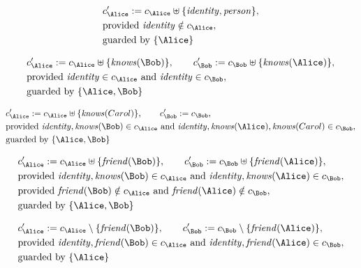 \begin{align*}
&
c'_
{
\Alice
}
 := 
c_
{
\Alice
}
 \uplus 
\{
\mathit{
identity
}
,
\mathit{
person
}
\}
,\\
&
\text{provided } 
\mathit{
identity
}
 \notin c_
{
\Alice
}
,\\
&
\text{guarded by } \{
\Alice
\}
\end{align*}

\begin{align*}
&
c'_
{
\Alice
}
 := 
c_
{
\Alice
}
 \uplus 
\{
\mathit{
knows
}
(
\Bob
)
\}
, \qquad 
c'_
{
\Bob
}
 := 
c_
{
\Bob
}
 \uplus 
\{
\mathit{
knows
}
(
\Alice
)
\}
,\\
&
\text{provided } 
\mathit{
identity
}
 \in c_
{
\Alice
}
 \text{ and } 
\mathit{
identity
}
 \in c_
{
\Bob
}
,\\
&
\text{guarded by } \{
\Alice
,
\Bob
\}
\end{align*}

\begin{align*}
&
c'_
{
\Alice
}
 := 
c_
{
\Alice
}
 \uplus 
\{
\mathit{
knows
}
(
Carol
)
\}
, \qquad 
c'_
{
\Bob
}
 := 
c_
{
\Bob
}
,\\
&
\text{provided } 
\mathit{
identity
}
,
\mathit{
knows
}
(
\Bob
)
 \in c_
{
\Alice
}
 \text{ and } 
\mathit{
identity
}
,
\mathit{
knows
}
(
\Alice
)
,
\mathit{
knows
}
(
Carol
)
 \in c_
{
\Bob
}
,\\
&
\text{guarded by } \{
\Alice
,
\Bob
\}
\end{align*}

\begin{align*}
&
c'_
{
\Alice
}
 := 
c_
{
\Alice
}
 \uplus 
\{
\mathit{
friend
}
(
\Bob
)
\}
, \qquad 
c'_
{
\Bob
}
 := 
c_
{
\Bob
}
 \uplus 
\{
\mathit{
friend
}
(
\Alice
)
\}
,\\
&
\text{provided } 
\mathit{
identity
}
,
\mathit{
knows
}
(
\Bob
)
 \in c_
{
\Alice
}
 \text{ and } 
\mathit{
identity
}
,
\mathit{
knows
}
(
\Alice
)
 \in c_
{
\Bob
}
,\\
&
\text{provided } 
\mathit{
friend
}
(
\Bob
)
 \notin c_
{
\Alice
}
 \text{ and } 
\mathit{
friend
}
(
\Alice
)
 \notin c_
{
\Bob
}
,\\
&
\text{guarded by } \{
\Alice
,
\Bob
\}
\end{align*}

\begin{align*}
&
c'_
{
\Alice
}
 := 
c_
{
\Alice
}
 \setminus 
\{
\mathit{
friend
}
(
\Bob
)
\}
, \qquad 
c'_
{
\Bob
}
 := 
c_
{
\Bob
}
 \setminus 
\{
\mathit{
friend
}
(
\Alice
)
\}
,\\
&
\text{provided } 
\mathit{
identity
}
,
\mathit{
friend
}
(
\Bob
)
 \in c_
{
\Alice
}
 \text{ and } 
\mathit{
identity
}
,
\mathit{
friend
}
(
\Alice
)
 \in c_
{
\Bob
}
,\\
&
\text{guarded by } \{
\Alice
\}
\end{align*}
